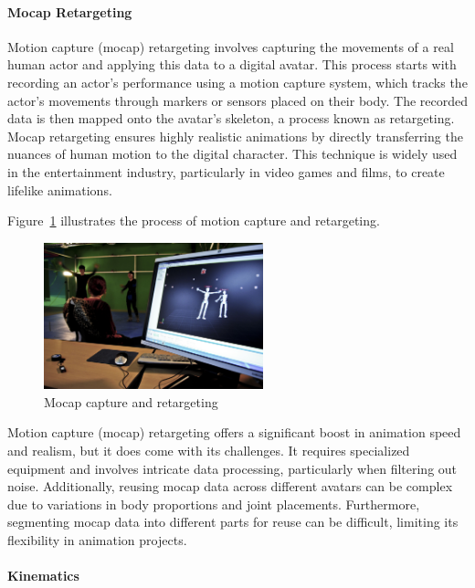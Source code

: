 \documentclass[../../main.tex]{subfiles}
\begin{document}
\paragraph{Mocap Retargeting}
\label{ch:background_work:sign_language_synthesis:3d_techniques:avatar_animation:mocap_retargeting}

Motion capture (mocap) retargeting involves capturing the movements of a real human actor and applying this data to a digital avatar. This process starts with recording an actor’s performance using a motion capture system, which tracks the actor’s movements through markers or sensors placed on their body. The recorded data is then mapped onto the avatar’s skeleton, a process known as retargeting. Mocap retargeting ensures highly realistic animations by directly transferring the nuances of human motion to the digital character. This technique is widely used in the entertainment industry, particularly in video games and films, to create lifelike animations.

Figure~\ref{fig:mocap} illustrates the process of motion capture and retargeting.

\begin{figure} 
  \centering \includegraphics[width = 2.5in]{chapters/background_work/images/mocap.png} 
  \caption{Mocap capture and retargeting} 
  \label{fig:mocap} 
\end{figure}

Motion capture (mocap) retargeting offers a significant boost in animation speed and realism, but it does come with its challenges. It requires specialized equipment and involves intricate data processing, particularly when filtering out noise. Additionally, reusing mocap data across different avatars can be complex due to variations in body proportions and joint placements. Furthermore, segmenting mocap data into different parts for reuse can be difficult, limiting its flexibility in animation projects.

\paragraph{Kinematics}
\label{ch:background_work:sign_language_synthesis:3d_techniques:avatar_animation:kinematics}
\end{document}
